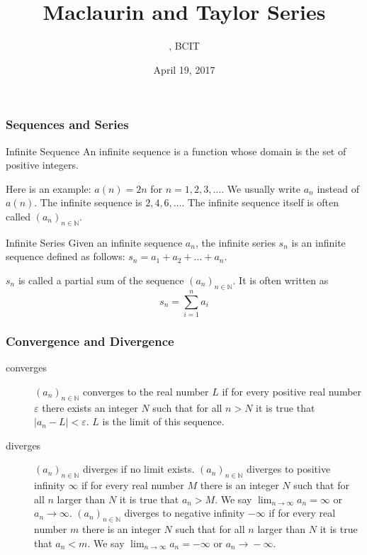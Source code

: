 \documentclass[xcolor=dvipsnames]{beamer}
\title{Maclaurin and Taylor Series}
\subtitle{{\CourseNumber}, BCIT}
\author{\CourseName}
\date{April 19, 2017}
\begin{document}
\begin{frame}
  \titlepage
\end{frame}

\begin{frame}
  \frametitle{Sequences and Series}
  \begin{block}{Infinite Sequence}
    An infinite sequence is a function whose
    domain is the set of positive integers.
  \end{block}
Here is an example: $a(n)=2n$ for $n=1,2,3,\ldots$. We usually write
$a_{n}$ instead of $a(n)$. The infinite sequence is $2,4,6,\ldots$.
The infinite sequence itself is often called $(a_{n})_{n\in\mathbb{N}}$.
\begin{block}{Infinite Series}
  Given an infinite sequence $a_{n}$, the infinite series $s_{n}$ is
  an infinite sequence defined as follows: $s_{n}=a_{1}+a_{2}+\ldots{}+a_{n}$.
\end{block}
$s_{n}$ is called a partial sum of the sequence
$(a_{n})_{n\in\mathbb{N}}$. It is often written as
\begin{equation}
  \label{eq:tahxooke}
  s_{n}=\sum_{i=1}^{n}a_{i}
\end{equation}
\end{frame}

\begin{frame}
  \frametitle{Convergence and Divergence}
  \begin{description}
  \item[converges] $(a_{n})_{n\in\mathbb{N}}$ converges to the real
    number $L$ if for every positive real number $\varepsilon$ there
    exists an integer $N$ such that for all $n>N$ it is true that
    $\vert{}a_{n}-L\vert{}<\varepsilon$. $L$ is the \alert{limit} of
    this sequence.
  \item[diverges] $(a_{n})_{n\in\mathbb{N}}$ diverges if no limit
    exists. $(a_{n})_{n\in\mathbb{N}}$ diverges to positive infinity
    $\infty$ if for every real number $M$ there is an integer $N$ such
    that for all $n$ larger than $N$ it is true that $a_{n}>M$. We say
    $\lim_{n\rightarrow\infty}a_{n}=\infty$ or
    $a_{n}\longrightarrow\infty$. $(a_{n})_{n\in\mathbb{N}}$ diverges
    to negative infinity $-\infty$ if for every real number $m$ there
    is an integer $N$ such that for all $n$ larger than $N$ it is true
    that $a_{n}<m$. We say $\lim_{n\rightarrow\infty}a_{n}=-\infty$ or
    $a_{n}\longrightarrow{}-\infty$.
  \end{description}
\end{frame}
\end{document}
